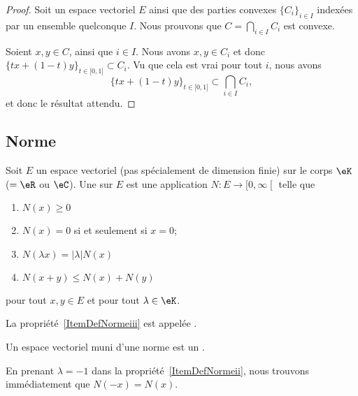 \begin{proof}
	Soit un espace vectoriel \( E\) ainsi que des parties convexes \( \{  C_i \}_{i\in I}\) indexées par un ensemble quelconque \( I\). Nous prouvons que \( C= \bigcap_{i\in I}C_i\) est convexe.

	Soient \( x, y\in C\), ainsi que \( i\in I\). Nous avons \( x,y\in C_i\) et donc \( \{ tx+(1-t)y \}_{t\in \mathopen[ 0 , 1 \mathclose]}\subset C_i\). Vu que cela est vrai pour tout \( i\), nous avons
	\begin{equation}
		\{ tx+(1-t)y \}_{t\in \mathopen[ 0 , 1 \mathclose]}\subset \bigcap_{i\in I}C_i,
	\end{equation}
	et donc le résultat attendu.
\end{proof}

\subsection{Norme}

\begin{definition}  \label{DefNorme}
	Soit \( E\) un espace vectoriel (pas spécialement de dimension finie) sur le corps \( \eK\) (\( =\eR\) ou \( \eC\)). Une   sur \( E\) est une application \( N\colon E\to\mathopen[ 0 , \infty \mathclose[\) telle que
	\begin{enumerate}
		\item
		      \( N(x)\geq 0\)
		\item
		      \( N(x)=0\) si et seulement si \( x=0\);
		\item\label{ItemDefNormeii}
		      \( N(\lambda x)=| \lambda |N(x)\)
		\item\label{ItemDefNormeiii}
		      \( N(x+y)\leq N(x)+N(y)\)
	\end{enumerate}
	pour tout \( x,y\in E\) et pour tout \( \lambda\in\eK\).

	La propriété~\ref{ItemDefNormeiii} est appelée .

	Un espace vectoriel muni d'une norme est un .
\end{definition}
En prenant \( \lambda=-1\) dans la propriété~\ref{ItemDefNormeii}, nous trouvons immédiatement que \( N(-x)=N(x)\).

